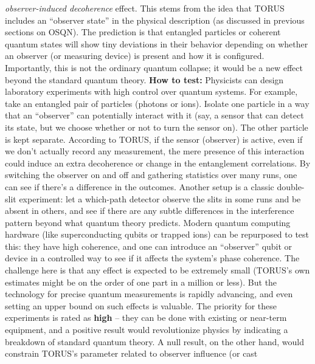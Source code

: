 \documentclass[
]{article}
\begin{document}
\begin{itemize}
  \emph{observer-induced decoherence} effect. This stems from the idea
  that TORUS includes an ``observer state'' in the physical description
  (as discussed in previous sections on OSQN). The prediction is that
  entangled particles or coherent quantum states will show tiny
  deviations in their behavior depending on whether an observer (or
  measuring device) is present and how it is configured\hspace{0pt}.
  Importantly, this is not the ordinary quantum collapse; it would be a
  new effect beyond the standard quantum theory. \textbf{How to test:}
  Physicists can design laboratory experiments with high control over
  quantum systems. For example, take an entangled pair of particles
  (photons or ions). Isolate one particle in a way that an ``observer''
  can potentially interact with it (say, a sensor that can detect its
  state, but we choose whether or not to turn the sensor on). The other
  particle is kept separate. According to TORUS, if the sensor
  (observer) is active, even if we don't actually record any
  measurement, the mere presence of this interaction could induce an
  extra decoherence or change in the entanglement correlations. By
  switching the observer on and off and gathering statistics over many
  runs, one can see if there's a difference in the outcomes\hspace{0pt}.
  Another setup is a classic double-slit experiment: let a which-path
  detector observe the slits in some runs and be absent in others, and
  see if there are any subtle differences in the interference pattern
  beyond what quantum theory predicts. Modern quantum computing hardware
  (like superconducting qubits or trapped ions) can be repurposed to
  test this: they have high coherence, and one can introduce an
  ``observer'' qubit or device in a controlled way to see if it affects
  the system's phase coherence\hspace{0pt}. The challenge here is that
  any effect is expected to be extremely small (TORUS's own estimates
  might be on the order of one part in a million or less\hspace{0pt}).
  But the technology for precise quantum measurements is rapidly
  advancing, and even setting an upper bound on such effects is
  valuable. The priority for these experiments is rated as \textbf{high}
  -- they can be done with existing or near-term equipment, and a
  positive result would revolutionize physics by indicating a breakdown
  of standard quantum theory. A null result, on the other hand, would
  constrain TORUS's parameter related to observer influence (or cast

\end{itemize}
\end{document}
